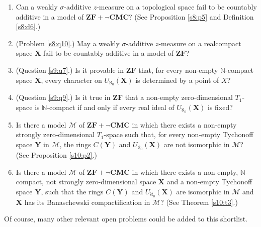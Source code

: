 \documentclass[12pt,twoside,leqno]{article}
\theoremstyle{plain}
\theoremstyle{definition}
\theoremstyle{remark}
\begin{document}
\begin{enumerate}
	\item Can a weakly $\sigma$-additive $z$-measure on a topological space fail to be countably additive in a model of $\mathbf{ZF+\neg CMC}$? (See Proposition \ref{s8:p5} and Definition \ref{s8:d6}.)
	
	\item (Problem \ref{s8:q10}.) May a weakly $\sigma$-additive $z$-measure on a realcompact space $\mathbf{X}$ fail to be countably additive in a model of $\mathbf{ZF}$?
	
	\item  (Question \ref{s9:q7}.) Is it provable in $\mathbf{ZF}$ that, for every non-empty $\mathbb{N}$-compact space $\mathbf{X}$, every character on $U_{\aleph_0}(\mathbf{X})$ is determined by a point of $X$?
	
	\item (Question \ref{s9:q9}.) Is it true in $\mathbf{ZF}$ that a non-empty zero-dimensional $T_1$-space is $\mathbb{N}$-compact if and only if every real ideal of $U_{\aleph_0}(\mathbf{X})$ is fixed?
	
	\item Is there a model $\mathcal{M}$ of $\mathbf{ZF+\neg CMC}$ in which there exists a non-empty strongly zero-dimensional $T_1$-space such that, for every non-empty Tychonoff space $\mathbf{Y}$ in $\mathcal{M}$, the rings $C(\mathbf{Y})$ and $U_{\aleph_0}(\mathbf{X})$ are not isomorphic in $\mathcal{M}$? (See Proposition \ref{s10:p2}.)
	
	\item Is there a model $\mathcal{M}$ of $\mathbf{ZF+\neg CMC}$ in which there exists a non-empty,  $\mathbb{N}$-compact, not strongly zero-dimensional space $\mathbf{X}$ and a non-empty Tychonoff space $\mathbf{Y}$, such that the rings $C(\mathbf{Y})$ and $U_{\aleph_0}(\mathbf{X})$ are isomorphic in $\mathcal{M}$ and $\mathbf{X}$ has its Banaschewski compactification in $\mathcal{M}$? (See Theorem \ref{s10:t3}.)
\end{enumerate}

Of course, many other relevant open problems could be added to this shortlist.
\end{document}
